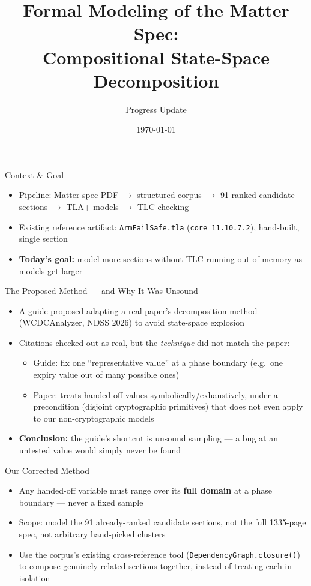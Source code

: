\documentclass{beamer}
\title{Formal Modeling of the Matter Spec:\\Compositional State-Space Decomposition}
\subtitle{Progress Update}
\author{}
\date{\today}
\begin{document}
\frame{\titlepage}

\begin{frame}{Context \& Goal}
\begin{itemize}
  \item Pipeline: Matter spec PDF $\rightarrow$ structured corpus $\rightarrow$
        91 ranked candidate sections $\rightarrow$ TLA+ models $\rightarrow$ TLC checking
  \item Existing reference artifact: \texttt{ArmFailSafe.tla}
        (\texttt{core\_11.10.7.2}), hand-built, single section
  \item \textbf{Today's goal:} model more sections without TLC running out
        of memory as models get larger
\end{itemize}
\end{frame}

\begin{frame}{The Proposed Method — and Why It Was Unsound}
\begin{itemize}
  \item A guide proposed adapting a real paper's decomposition method
        (WCDCAnalyzer, NDSS 2026) to avoid state-space explosion
  \item Citations checked out as real, but the \emph{technique} did not
        match the paper:
  \begin{itemize}
    \item Guide: fix one ``representative value'' at a phase boundary
          (e.g.\ one expiry value out of many possible ones)
    \item Paper: treats handed-off values symbolically/exhaustively,
          under a precondition (disjoint cryptographic primitives) that
          does not even apply to our non-cryptographic models
  \end{itemize}
  \item \textbf{Conclusion:} the guide's shortcut is unsound sampling —
        a bug at an untested value would simply never be found
\end{itemize}
\end{frame}

\begin{frame}{Our Corrected Method}
\begin{itemize}
  \item Any handed-off variable must range over its \textbf{full domain}
        at a phase boundary — never a fixed sample
  \item Scope: model the 91 already-ranked candidate sections, not the
        full 1335-page spec, not arbitrary hand-picked clusters
  \item Use the corpus's existing cross-reference tool
        (\texttt{DependencyGraph.closure()}) to compose genuinely related
        sections together, instead of treating each in isolation
\end{itemize}
\end{frame}
\end{document}
